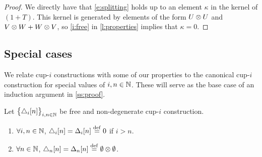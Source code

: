 \begin{proof}
	We directly have that \eqref{e:splitting} holds up to an element $\kappa$ in the kernel of $(1+T)$.
	This kernel is generated by elements of the form $U \otimes U$ and $V \otimes W + W \otimes V$, so \cref{i:free} in \cref{l:properties} implies that $\kappa = 0$.
\end{proof}

\subsection{Special cases} \label{ss:cases}

We relate cup-$i$ constructions with some of our properties to the canonical cup-$i$ construction for special values of $i,n \in \mathbb{N}$.
These will serve as the base case of an induction argument in \cref{ss:proof}.

\begin{lemma} \label{l:special case one}
	Let $\big\{ \triangle_i [n] \big\}_{i,n\in\mathbb{N}}$ be free and non-degenerate \mbox{cup-$i$} construction.
	\begin{enumerate}
		\item \label{i:i>n} $\forall i,n \in \mathbb{N}$, $\triangle_i[n] = \Delta_i [n] \stackrel{\mathrm{def}}{=} 0$ if $i > n$.
		\item \label{i:i=n} $\forall n \in \mathbb{N}$, $\triangle_n[n] = \Delta_n [n] \stackrel{\mathrm{def}}{=} \emptyset \otimes \emptyset$.
	\end{enumerate}
\end{lemma}

